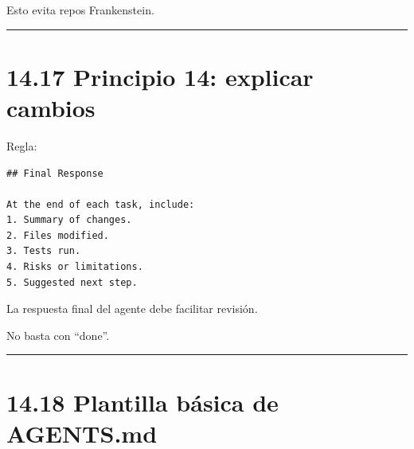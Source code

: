 Esto evita repos Frankenstein.

\begin{center}\rule{0.5\linewidth}{0.5pt}\end{center}

\section{14.17 Principio 14: explicar
cambios}\label{principio-14-explicar-cambios}

Regla:

\begin{lstlisting}
## Final Response

At the end of each task, include:
1. Summary of changes.
2. Files modified.
3. Tests run.
4. Risks or limitations.
5. Suggested next step.
\end{lstlisting}

La respuesta final del agente debe facilitar revisión.

No basta con ``done''.

\begin{center}\rule{0.5\linewidth}{0.5pt}\end{center}

\section{14.18 Plantilla básica de
AGENTS.md}\label{plantilla-buxe1sica-de-agents.md}

